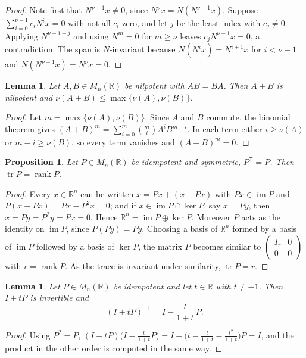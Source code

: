\documentclass[11pt]{amsart}
\newtheorem{lemma}[theorem]{Lemma}
\newtheorem{proposition}[theorem]{Proposition}
\theoremstyle{definition}
\theoremstyle{remark}
\newcommand{\R}{\mathbb{R}}
\newcommand{\M}{M_n(\R)}
\DeclareMathOperator{\tr}{tr}
\DeclareMathOperator{\rank}{rank}
\DeclareMathOperator{\im}{im}
\begin{document}
\begin{proof}
Note first that $N^{\nu-1}x\ne0$, since $N^\nu x=N(N^{\nu-1}x)$. Suppose
$\sum_{i=0}^{\nu-1}c_iN^ix=0$ with not all $c_i$ zero, and let $j$ be the
least index with $c_j\ne 0$. Applying $N^{\nu-1-j}$ and using $N^m=0$ for
$m\ge\nu$ leaves $c_jN^{\nu-1}x=0$, a contradiction. The span is
$N$-invariant because $N(N^{i}x)=N^{i+1}x$ for $i<\nu-1$ and
$N(N^{\nu-1}x)=N^\nu x=0$.
\end{proof}

\begin{lemma}\label{lem:sum}
Let $A,B\in\M$ be nilpotent with $AB=BA$. Then $A+B$ is nilpotent and
$\nu(A+B)\le\max\{\nu(A),\nu(B)\}$.
\end{lemma}

\begin{proof}
Let $m=\max\{\nu(A),\nu(B)\}$. Since $A$ and $B$ commute, the binomial
theorem gives $(A+B)^m=\sum_{i=0}^m\binom mi A^iB^{m-i}$. In each term
either $i\ge\nu(A)$ or $m-i\ge\nu(B)$, so every term vanishes and
$(A+B)^m=0$.
\end{proof}

\begin{proposition}\label{prop:trace}
Let $P\in\M$ be idempotent and symmetric, $P^{\mathsf T}=P$. Then
$\tr P=\rank P$.
\end{proposition}

\begin{proof}
Every $x\in\R^n$ can be written $x=Px+(x-Px)$ with $Px\in\im P$ and
$P(x-Px)=Px-P^2x=0$; and if $x\in\im P\cap\ker P$, say $x=Py$, then
$x=Py=P^2y=Px=0$. Hence $\R^n=\im P\oplus\ker P$. Moreover $P$ acts as the
identity on $\im P$, since $P(Py)=Py$. Choosing a basis of $\R^n$ formed by a
basis of $\im P$ followed by a basis of $\ker P$, the matrix $P$ becomes
similar to $\begin{pmatrix} I_r&0\\0&0\end{pmatrix}$ with $r=\rank P$. As the
trace is invariant under similarity, $\tr P=r$.
\end{proof}

\begin{lemma}\label{lem:resolvent}
Let $P\in\M$ be idempotent and let $t\in\R$ with $t\ne-1$. Then $I+tP$ is
invertible and
\[
(I+tP)^{-1}=I-\frac{t}{1+t}\,P.
\]
\end{lemma}

\begin{proof}
Using $P^2=P$,
$(I+tP)\bigl(I-\tfrac{t}{1+t}P\bigr)
=I+\bigl(t-\tfrac{t}{1+t}-\tfrac{t^2}{1+t}\bigr)P=I$, and the product in
the other order is computed in the same way.
\end{proof}
\end{document}
